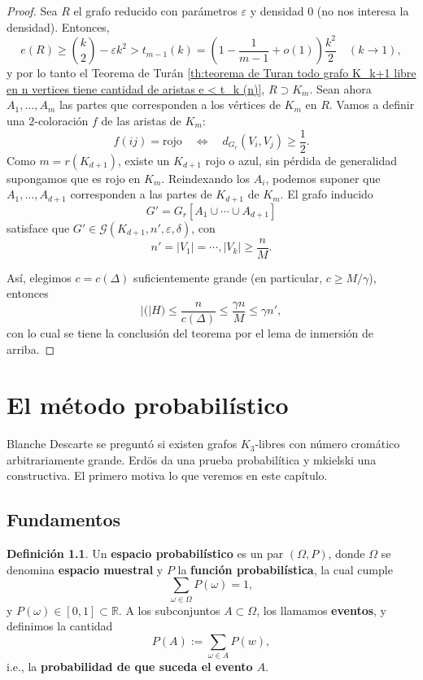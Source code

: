 \documentclass[12pt]{report}
\theoremstyle{plain}
\theoremstyle{definition}
\newtheorem{definition}[theorem]{Definición}
\newcommand{\reals}{\mathbb{R}}
\newcommand{\abs}[1]{\left \vert #1 \right \vert}
\begin{document}
\begin{proof}
Sea $R$ el grafo reducido con parámetros $\varepsilon$ y densidad $0$ (no nos interesa la densidad). Entonces,
\[
    e(R) \geq \binom k 2     - \varepsilon k^2 > t_{m-1} (k) = \left ( 1 - \frac{1}{m-1} + o(1) \right) \frac{k^2}{2}  \quad (k \longrightarrow 1),
\]
y por lo tanto el Teorema de Turán \ref{th:teorema de Turan todo grafo K_k+1 libre en n vertices tiene cantidad de aristas e < t_k (n)}, $R \supset K_m$. Sean ahora $A_1, \ldots, A_m$ las partes que corresponden a los vértices de $K_m$ en $R$. Vamos a definir una $2$-coloración $f$ de las aristas de $K_m$:
\[
    f(ij) = \text{rojo} \quad \Leftrightarrow \quad d_{G_r} (V_i, V_j) \geq \frac{1}{2}.
\]
Como $m = r (K_{d + 1})$, existe un $K_{d + 1}$ rojo o azul, sin pérdida de generalidad supongamos que es rojo en $K_m$. Reindexando los $A_i$, podemos suponer que $A_1, \ldots, A_{d+1}$ corresponden a las partes de $K_{d+1}$ de $K_m$. El grafo inducido
\[
    G' = G_r [A_1 \cup \cdots \cup A_{d+1}]
\]
satisface que $G' \in \mathcal G (K_{d+1}, n', \varepsilon, \delta)$, con
\[
    n' = \abs{V_1} = \cdots, \abs{V_k} \geq \frac{n}{M}.
\]

Así, elegimos $c = c(\Delta)$ suficientemente grande (en particular, $c \geq M/\gamma$), entonces
\[
    \abs (H) \leq \frac{n}{c(\Delta)} \leq \frac{\gamma n}{M} \leq \gamma n',
\]
con lo cual se tiene la conclusión del teorema por el lema de inmersión de arriba.
\end{proof}







\chapter{El método probabilístico}

Blanche Descarte se preguntó si existen grafos $K_3$-libres con número cromático arbitrariamente grande. Erdös da una prueba probabilítica y mkielski una constructiva. El primero motiva lo que veremos en este capítulo.


\section{Fundamentos}

\begin{definition}
Un \textbf{espacio probabilístico} es un par $(\Omega, P)$, donde $\Omega$ se denomina \textbf{espacio muestral} y $P$ la \textbf{función probabilística}, la cual cumple
\[
    \sum_{\omega \in \Omega} P(\omega) = 1,
\]
y $P(\omega) \in [0,1] \subset \reals$. A los subconjuntos $A \subset \Omega$, los llamamos \textbf{eventos}, y definimos la cantidad
\[
    P(A) := \sum_{\omega \in A} P (w),
\]
i.e., la \textbf{probabilidad de que suceda el evento $A$}.
\end{definition}
\end{document}
